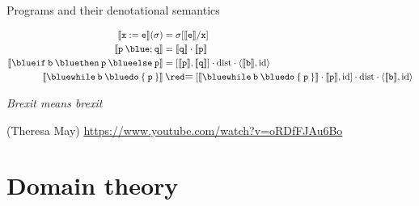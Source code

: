\documentclass{beamer}
\begin{document}
\begin{frame}{Programs and their denotational semantics}

        \begin{align*}
                \sem{\prog{x : = e}}(\sigma) & = \sigma[\sem{\prog{e}}/\prog{x}] \\
                \sem{\prog{p} \> {\blue ;} \> \prog{q}} & 
                = \sem{\prog{q}} \comp \sem{\prog{p}} \\
                \sem{\mathtt{{\blue if} \> b \> {\blue then} \> p \> {\blue else} \> p}}
                                                        & 
                                                        = [\sem{\prog{p}},\sem{\prog{q}}] \comp
                                                        \mathrm{dist} \comp \pv{\sem{\prog{b}}}{\id}
                \\
                \sem{\mathtt{{\blue while} \> b \> {\blue do} \> \{ \> p \> \}} }
                                                        & \> {\red \scalebox{1.2}{=}} \>
                [\sem{\mathtt{{\blue while} \> b \> {\blue do} \> \{ \> p \> \}} } \comp 
                \sem{\prog{p}},\id] \comp
                \mathrm{dist} \comp \pv{\sem{\prog{b}}}{\id}
        \end{align*}

        \pause
        \begin{flushright}
        \emph{Brexit means brexit}


        \scriptsize{(Theresa May) \url{https://www.youtube.com/watch?v=oRDfFJAu6Bo}}
        \end{flushright}

\end{frame}

\section{Domain theory}



\end{document}
